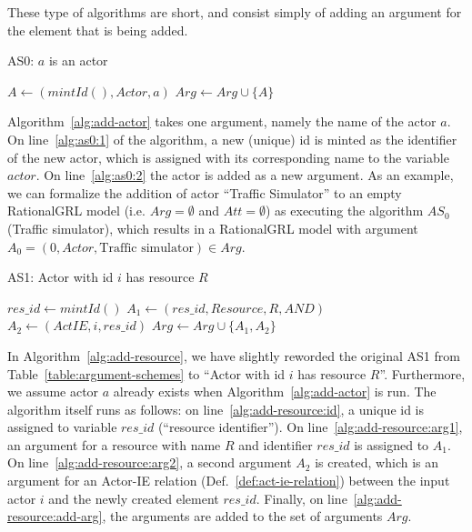 These type of algorithms are short, and consist simply of adding an argument for the element that is being added. 

\begin{algorithm}[h]
  \caption{AS0: $a$ is an actor}\label{alg:add-actor}
  \begin{algorithmic}[1]
    \State $A \leftarrow (mintId(), Actor, a)$ \label{alg:as0:1}
    \State $Arg\leftarrow Arg \cup \{A\}$\label{alg:as0:2}
    \EndProcedure
  \end{algorithmic}
\end{algorithm}

Algorithm~\ref{alg:add-actor} takes one argument, namely the name of the actor $a$. On line~\ref{alg:as0:1} of the algorithm, a new (unique) id is minted as the identifier of the new actor, which is assigned with its corresponding name to the variable $actor$. On line~\ref{alg:as0:2} the actor is added as a new argument. As an example, we can formalize the addition of actor ``Traffic Simulator'' to an empty RationalGRL model (i.e. $Arg=\emptyset$ and $Att=\emptyset$) as executing the algorithm $AS_0$(Traffic simulator), which results in a RationalGRL model with argument $A_0 = (0, Actor, \text{Traffic simulator})\in Arg$.

\begin{algorithm}[h]
  \caption{AS1: Actor with id $i$ has resource $R$}\label{alg:add-resource}
  \begin{algorithmic}[1]
    \State $res\_id\gets mintId()$\label{alg:add-resource:id}
    \State $A_1\leftarrow (res\_id, Resource, R, AND)$\label{alg:add-resource:arg1}
    \State $A_2\leftarrow (ActIE, i, res\_id)$\label{alg:add-resource:arg2}
    \State $Arg\gets Arg\cup \{A_1,A_2\}$\label{alg:add-resource:add-arg}
    \EndProcedure
  \end{algorithmic}
\end{algorithm}

In Algorithm~\ref{alg:add-resource}, we have slightly reworded the original AS1 from Table~\ref{table:argument-schemes} to ``Actor with id $i$ has resource $R$''. Furthermore, we assume actor $a$ already exists when Algorithm~\ref{alg:add-actor} is run. The algorithm itself runs as follows: on line~\ref{alg:add-resource:id}, a unique id is assigned to variable $res\_id$ (``resource identifier''). On line~\ref{alg:add-resource:arg1}, an argument for a resource with name $R$ and identifier $res\_id$ is assigned to $A_1$. On line~\ref{alg:add-resource:arg2}, a second argument $A_2$ is created, which is an argument for an Actor-IE relation (Def.~\ref{def:act-ie-relation}) between the input actor $i$ and the newly created element $res\_id$. Finally, on line~\ref{alg:add-resource:add-arg}, the arguments are added to the set of arguments $Arg$.

